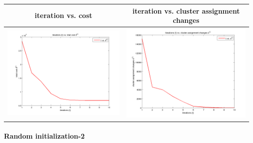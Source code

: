 \documentclass[fleqn]{article}
\newcommand{\myparagraph}[1]{\paragraph{#1}\mbox{}\\}
\begin{document}
\begin{center}
  \begin{longtable}{ c | c }
	\multicolumn{1}{c}{iteration vs. cost} & 
	\multicolumn{1}{c}{iteration vs. cluster assignment changes}  \\
    \hline
    \includegraphics[scale=0.4]{./pics/task1and2/spectrum_k=7_random1/t_vs_d_random_7_spectrum.png}  & \includegraphics[scale=0.4]{./pics/task1and2/spectrum_k=7_random1/t_vs_s_random_7_spectrum.png} \\
    \hline
  \end{longtable}
\end{center}

\myparagraph{Random initialization-2}
\end{document}
